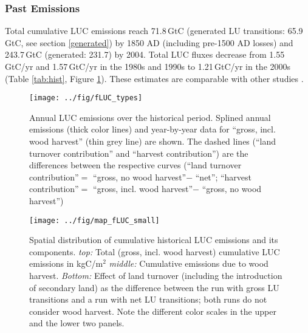 \subsubsection*{Past Emissions}
Total cumulative LUC emissions reach 71.8\,GtC (generated LU transitions: 65.9\,GtC, see section \ref{generated}) by 1850 AD (including pre-1500 AD losses) and 243.7\,GtC (generated: 231.7) by 2004. Total LUC fluxes decrease from 1.55\,GtC/yr and 1.57\,GtC/yr in the 1980s and 1990s to 1.21\,GtC/yr in the 2000s (Table \ref{tab:hist}, Figure \ref{fig:fluc.hist}). These estimates are comparable with other studies \citep{pan11sci,stocker11bg,houghton12bg}. 
\begin{figure}
\begin{center}
 \noindent
 \texttt{[image: ../fig/fLUC\_types]}
 \caption[Annual LUC emissions over the historical period]{Annual LUC emissions over the historical period. Splined annual emissions (thick color lines) and year-by-year data for ``gross, incl. wood harvest'' (thin grey line) are shown. The dashed lines (``land turnover contribution'' and ``harvest contribution'') are the differences between the respective curves (``land turnover contribution''$=$ ``gross, no wood harvest''$-$ ``net''; ``harvest contribution''$=$ ``gross, incl. wood harvest''$-$ ``gross, no wood harvest'')}
 \label{fig:fluc.hist}
\end{center}
\end{figure}

\begin{figure}
\begin{center}
 \noindent
 \texttt{[image: ../fig/map\_fLUC\_small]}
 \caption[Spatial distribution of cumulative historical LUC emissions and its components]{Spatial distribution of cumulative historical LUC emissions and its components. {\it top:} Total (gross, incl. wood harvest) cumulative LUC emissions in kgC/m$^2$ {\it middle:} Cumulative emissions due to wood harvest. {\it Bottom:} Effect of land turnover (including the introduction of secondary land) as the difference between the run with gross LU transitions and a run with net LU transitions; both runs do not consider wood harvest. Note the different color scales in the upper and the lower two panels.}
 \label{fig:fluc.hist.map}
\end{center}
\end{figure}

